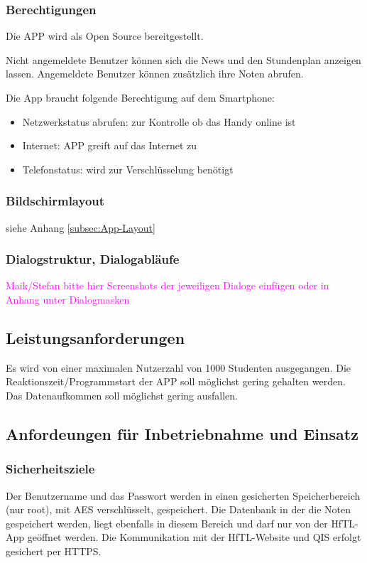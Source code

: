 \subsubsection{Berechtigungen}

Die APP wird als Open Source bereitgestellt.

Nicht angemeldete Benutzer können sich die News und den Stundenplan anzeigen lassen. Angemeldete Benutzer können zusätzlich ihre Noten abrufen.

Die App braucht folgende Berechtigung auf dem Smartphone:
\begin{itemize}
	\item Netzwerkstatus abrufen: zur Kontrolle ob das Handy online ist
	\item Internet: APP greift auf das Internet zu
	\item Telefonstatus: wird zur Verschlüsselung benötigt
\end{itemize}




\subsubsection{Bildschirmlayout}
siehe Anhang \ref{subsec:App-Layout}





\subsubsection{Dialogstruktur, Dialogabläufe}
\textcolor{magenta}{Maik/Stefan bitte hier Screenshots der jeweiligen Dialoge einfügen oder in Anhang unter Dialogmasken}





\subsection{\textbf{Leistungsanforderungen}}
Es wird von einer maximalen Nutzerzahl von 1000 Studenten ausgegangen.
Die Reaktionszeit/Programmstart der APP soll möglichst gering gehalten werden.
Das Datenaufkommen soll möglichst gering ausfallen.


\subsection{\textbf{Anfordeungen für Inbetriebnahme und Einsatz}}

\subsubsection{Sicherheitsziele}
Der Benutzername und das Passwort werden in einen gesicherten Speicherbereich (nur root), mit \acs{AES} verschlüsselt, gespeichert.
Die Datenbank in der die Noten gespeichert werden, liegt ebenfalls in diesem Bereich und darf nur von der \acs{HfTL}-App geöffnet werden.
Die Kommunikation mit der \acs{HfTL}-Website und \acs{QIS} erfolgt gesichert per \acs{HTTPS}.



